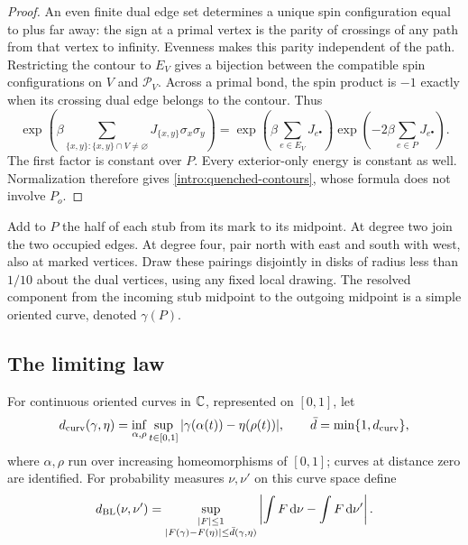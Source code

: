 \begin{proof}
An even finite dual edge set determines a unique spin configuration
equal to plus far away: the sign at a primal vertex is the parity of
crossings of any path from that vertex to infinity. Evenness makes this
parity independent of the path. Restricting the contour to $E_V$ gives
a bijection between the compatible spin configurations on $V$ and
$\mathcal P_V$. Across a primal bond, the spin product is $-1$
exactly when its crossing dual edge belongs to the contour. Thus
\[
 \exp\left(\beta\sum_{\{x,y\}:\{x,y\}\cap V\ne\varnothing}
                      J_{\{x,y\}}\sigma_x\sigma_y\right)
 =\exp\left(\beta\sum_{e\in E_V}J_{e^\bullet}\right)
       \exp\left(-2\beta\sum_{e\in P}J_{e^\bullet}\right).
\]
The first factor is constant over $P$. Every exterior-only energy is
constant as well. Normalization therefore gives
\eqref{intro:quenched-contours}, whose formula does not involve $P_o$.
\end{proof}

Add to $P$ the half of each stub from its mark to its midpoint. At
degree two join the two occupied edges. At degree four, pair north
with east and south with west, also at marked vertices. Draw these
pairings disjointly in disks of radius less than $1/10$ about the dual
vertices, using any fixed local drawing. The resolved component from
the incoming stub midpoint to the outgoing midpoint is a simple
oriented curve, denoted $\gamma(P)$.

\subsection{The limiting law}

For continuous oriented curves in $\mathbb C$, represented on $[0,1]$, let
\begin{equation}\label{intro:curve-distance}
 d_{\rm curv}(\gamma,\eta)
 =\inf_{\alpha,\rho}\sup_{t\in[0,1]}
             |\gamma(\alpha(t))-\eta(\rho(t))|,
 \qquad \bar d=\min\{1,d_{\rm curv}\},
\end{equation}
where $\alpha,\rho$ run over increasing homeomorphisms of $[0,1]$;
curves at distance zero are identified. For probability measures
$\nu,\nu'$ on this curve space define
\begin{equation}\label{intro:BL-distance}
 d_{\rm BL}(\nu,\nu')
 =\sup_{\substack{|F|\le1\\
           |F(\gamma)-F(\eta)|\le\bar d(\gamma,\eta)}}
           \left|\int F\,\mathrm d\nu-\int F\,\mathrm d\nu'\right|.
\end{equation}

